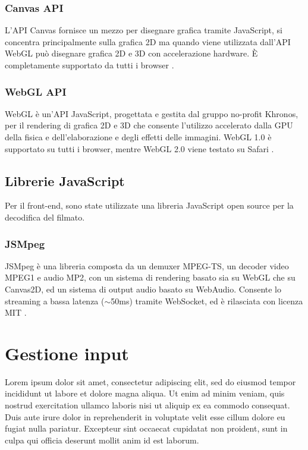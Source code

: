 \subsubsection{Canvas API}
L'API Canvas fornisce un mezzo per disegnare grafica tramite JavaScript, si concentra principalmente sulla grafica 2D ma quando viene utilizzata dall'API WebGL può disegnare grafica 2D e 3D con accelerazione hardware. È completamente supportato da tutti i browser \parencite{Canvas_API}.

\subsubsection{WebGL API}
WebGL è un'API JavaScript, progettata e gestita dal gruppo no-profit Khronos, per il rendering di grafica 2D e 3D che consente l'utilizzo accelerato dalla GPU della fisica e dell'elaborazione e degli effetti delle immagini. WebGL 1.0 è supportato su tutti i browser, mentre WebGL 2.0 viene testato su Safari \parencite{WebGL}.



\subsection{Librerie JavaScript}
Per il front-end, sono state utilizzate una libreria JavaScript open source per la decodifica del filmato.

\subsubsection{JSMpeg}
JSMpeg è una libreria composta da un demuxer MPEG-TS, un decoder video MPEG1 e audio MP2, con un sistema di rendering basato sia su WebGL che su Canvas2D, ed un sistema di output audio basato su WebAudio. Consente lo streaming a bassa latenza ($\sim$50ms) tramite WebSocket, ed è rilasciata con licenza MIT \parencite{JSMpeg}.




\section{Gestione input}
Lorem ipsum dolor sit amet, consectetur adipiscing elit, sed do eiusmod tempor incididunt ut labore et dolore magna aliqua. Ut enim ad minim veniam, quis nostrud exercitation ullamco laboris nisi ut aliquip ex ea commodo consequat. Duis aute irure dolor in reprehenderit in voluptate velit esse cillum dolore eu fugiat nulla pariatur. Excepteur sint occaecat cupidatat non proident, sunt in culpa qui officia deserunt mollit anim id est laborum.

